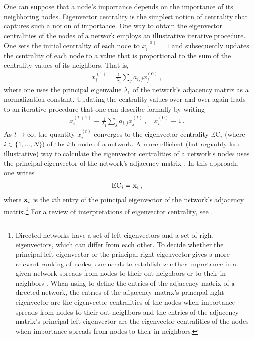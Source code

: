 \documentclass{comnet-mod}
\begin{document}
One can suppose that a node's importance depends on the importance of its neighboring nodes. Eigenvector centrality is the simplest notion of centrality that captures such a notion of importance. One way to obtain the eigenvector centralities of the nodes of a network employs an illustrative iterative procedure. One sets the initial centrality of each node to $x_i^{(0)} = 1$ and subsequently updates the centrality of each node to a value that is proportional to the sum of the centrality values of its neighbors, That is,
\begin{align}
	x_i^{(1)}=\frac{1}{\lambda_1}\sum_ja_{i,j}x_j^{(0)}\,,\nonumber
\end{align}
where one uses the principal eigenvalue  $\lambda_1$ of the network's adjacency matrix as a normalization constant. Updating the centrality values over and over again leads to an iterative procedure that one can describe formally by writing
\begin{align}
	x_i^{(t+1)} = \frac{1}{\lambda_1}\sum_j a_{i,j}{x_j^{(t)}}\,, \quad
	x_i^{(0)} = 1\,.\label{eq:ev-iteration}
\end{align}
As $t \rightarrow \infty$, the quantity $x_i^{(t)}$ converges to the eigenvector centrality $\textrm{EC}_i$ (where $i \in\{1,\dots,N\}$) of the $i$th node of a network. A more efficient (but arguably less illustrative) way to calculate the eigenvector centralities of a network's nodes uses the principal eigenvector of the network's adjacency matrix \cite[p.\,169]{Newman2018}. In this approach, one writes
\begin{align}
	\textrm{EC}_i = {\bf x}_i\,,\nonumber
\end{align}
where ${\bf x}_i$ is the $i$th entry of the principal eigenvector of the network's adjacency matrix.\footnote{Directed networks have a set of left eigenvectors and a set of right eigenvectors, which can differ from each other. To decide whether the principal left eigenvector or the principal right eigenvector gives a more relevant ranking of nodes, one needs to establish whether importance in a given network spreads from nodes to their out-neighbors or to their in-neighbors \cite[p.\,161--162]{Newman2018}. When using  to define the entries of the adjacency matrix of a directed network, the entries of the adjacency matrix's principal right eigenvector are the eigenvector centralities of the nodes when importance spreads from nodes to their out-neighbors and the entries of the adjacency matrix's principal left eigenvector are the eigenvector centralities of the nodes when importance spreads from nodes to their in-neighbors.} For a review of interpretations of eigenvector centrality, see \cite{Baek2021}.
 
\end{document}
